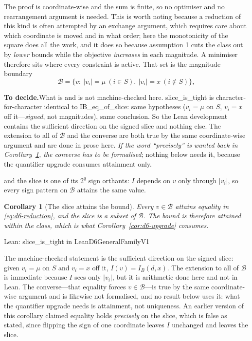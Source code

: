 \documentclass[conference]{IEEEtran}
\newtheorem{corollary}[theorem]{Corollary}
\theoremstyle{definition}
\newcommand{\lean}[1]{\textsf{\footnotesize #1}}
\newcommand{\leanbox}[1]{%
  \par\vspace{2pt}\noindent
  {\footnotesize\textsf{Lean: #1}}\par\vspace{2pt}}
\newif\ifshownotes\shownotestrue
\newcommand{\TODOPAR}[1]{\ifshownotes\par\vspace{2pt}\noindent%
  {\color{todocol}\textsf{\footnotesize\textbf{To decide.}\;#1}}\par\vspace{2pt}\fi}
\begin{document}
The proof is coordinate-wise and the sum is finite, so no optimiser and no rearrangement
argument is needed. This is worth noting because a reduction of this kind is often attempted
by an exchange argument, which requires care about which coordinate is moved and in what
order; here the monotonicity of the square does all the work, and it does so because
assumption 1 cuts the class out by \emph{lower} bounds while the objective \emph{increases}
in each magnitude. A minimiser therefore sits where every constraint is active. That set is the magnitude
boundary
\begin{equation}
\mathcal{B}=\{v:\ |v_{i}|=\mu\ (i\in S),\ |v_{i}|=x\ (i\notin S)\},
\label{eq:d6-boundary}
\end{equation}
\TODOPAR{What is and is not machine-checked here. \lean{slice\_is\_tight} is
character-for-character identical to \lean{IB\_eq\_of\_slice}: same hypotheses
($v_{i}=\mu$ on $S$, $v_{i}=x$ off it---\emph{signed}, not magnitudes), same conclusion. So
the Lean development contains the sufficient direction on the signed slice and nothing else.
The extension to all of $\mathcal{B}$ and the converse are both true by the same
coordinate-wise argument and are done in prose here. \emph{If the word ``precisely'' is wanted
back in Corollary~\ref{cor:d6-tight}, the converse has to be formalised}; nothing below needs it,
because the quantifier upgrade consumes attainment only.}
and the slice is one of its $2^{q}$ sign orthants: $I$ depends on $v$ only through
$|v_{i}|$, so every sign pattern on $\mathcal{B}$ attains the same value.

\begin{corollary}[The slice attains the bound]
\label{cor:d6-tight}
Every $v\in\mathcal{B}$ attains equality in \eqref{eq:d6-reduction}, and the slice is a subset
of $\mathcal{B}$. The bound is therefore attained within the class, which is what
Corollary~\ref{cor:d6-upgrade} consumes.
\end{corollary}

\leanbox{\lean{slice\_is\_tight} in \lean{LeanD6GeneralFamilyV1}}

The machine-checked statement is the sufficient direction on the signed slice: given
$v_{i}=\mu$ on $S$ and $v_{i}=x$ off it, $I(v)=I_{B}(d,x)$. The extension to all of
$\mathcal{B}$ is immediate because $I$ sees only $|v_{i}|$, but it is arithmetic done here
and not in Lean. The converse---that equality forces $v\in\mathcal{B}$---is true by the same
coordinate-wise argument and is likewise not formalised, and no result below uses it: what
the quantifier upgrade needs is attainment, not uniqueness. An earlier version of this
corollary claimed equality holds \emph{precisely} on the slice, which is false as stated,
since flipping the sign of one coordinate leaves $I$ unchanged and leaves the slice.
\end{document}
